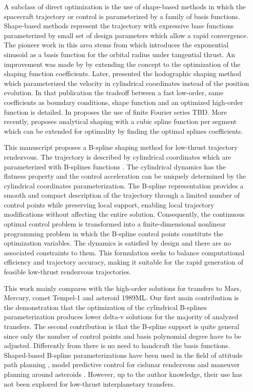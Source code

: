 \documentclass[a4paper,fleqn]{cas-sc}
\begin{document}
A subclass of direct optimization is the use of shape-based methods in which the spacecraft trajectory or control is parameterized by a family of basis functions. Shape-based methods represent the trajectory with expressive base functions parameterized by small set of design parameters which allow a rapid convergence. The pioneer work in this area stems from \citep{Petropoulos2004} which introduces the exponential sinusoid as a basis function for the orbital radius under tangential thrust. An improvement was made by \citep{NovakVasile2011} by extending the concept to the optimization of the shaping function coefficients. Later, \citep{Gondelach2015} presented the hodographic shaping method which parameterized the velocity in cylindrical coordinates instead of the position evolution. In that publication the tradeoff between a fast low-order, same coefficients as boundary conditions, shape function and an optimized high-order function is detailed. In \citep{Taheri2016} proposes the use of finite Fourier series TBD. More recently, \citep{Wu2022} proposes analytical shaping with a cubic spline function per segment which can be extended for optimality by finding the optimal splines coefficients.

This manuscript proposes a B-spline shaping method for low-thrust trajectory rendezvous. The trajectory is described by cylindrical coordinates which are parameterized with B-splines functions \citep{DeBoor1972}. The cylindrical dynamics has the flatness property \citep{Fliess1995} and the control acceleration can be uniquely determined by the cylindrical coordinates parameterization. The B-spline representation provides a smooth and compact description of the trajectory through a limited number of control points while preserving local support, enabling local trajectory modifications without affecting the entire solution. Consequently, the continuous optimal control problem is transformed into a finite-dimensional nonlinear programming problem in which the B-spline control points constitute the optimization variables. The dynamics is satisfied by design and there are no associated constraints to them. This formulation seeks to balance computational efficiency and trajectory accuracy, making it suitable for the rapid generation of feasible low-thrust rendezvous trajectories.

This work mainly compares with the \citep{Gondelach2015} high-order solutions for transfers to Mars, Mercury, comet Tempel-1 and asteroid 1989ML. Our first main contribution is the demonstration that the optimization of the cylindrical B-splines parameterization produces lower delta-v solutions for the majority of analyzed transfers. The second contribution is that the B-spline support is quite general since only the number of control points and basis polynomial degree have to be adjusted. Differently from \citep{Gondelach2015} there is no need to handcraft the basis functions. Shaped-based B-spline parameterizations have been used in the field of attitude path planning \citep{Louembet2009, Sanchez2020_AA}, model predictive control for cislunar rendezvous \citep{Sanchez2020_AA} and maneuver planning around asteroids \citep{Dambrosio2023}. However, up to the author knowledge, their use has not been explored for low-thrust interplanetary transfers.
\end{document}
